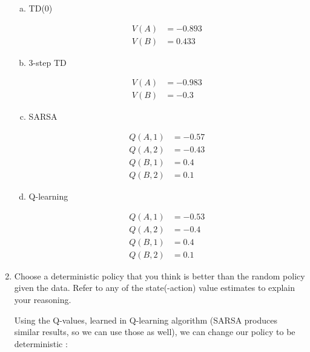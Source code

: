 \documentclass{exam}
\begin{document}
\begin{problem}
\begin{enumerate}
    \begin{enumerate}[(a)]
        \item TD(0)
        \begin{solutionorlines}[2in]
            \begin{align*}
                V(A) &= -0.893\\
                V(B) &= 0.433
            \end{align*}
        \end{solutionorlines}
        \item 3-step TD
        \begin{solutionorlines}[2in]
            \begin{align*}
                V(A) &= -0.983\\
                V(B) &= -0.3
            \end{align*}
        \end{solutionorlines}
        \item SARSA
        \begin{solutionorlines}[2in]
            \begin{align*}
                Q(A, 1) &= -0.57\\
                Q(A, 2) &= -0.43\\
                Q(B, 1) &= 0.4\\
                Q(B, 2) &= 0.1
            \end{align*}
        \end{solutionorlines}
        \item Q-learning
        \begin{solutionorlines}[2in]
            \begin{align*}
                Q(A, 1) &= -0.53\\
                Q(A, 2) &= -0.4\\
                Q(B, 1) &= 0.4\\
                Q(B, 2) &= 0.1
            \end{align*}
        \end{solutionorlines}
    \end{enumerate}
    \item Choose a deterministic policy that you think is better than the random policy given the data. Refer to any of the state(-action) value estimates to explain your reasoning.
    \begin{solutionorlines}[2in]
    Using the Q-values, learned in Q-learning algorithm (SARSA produces similar results, so we can use those as well), we can change our policy to be deterministic :

\end{solutionorlines}
\end{enumerate}
\end{problem}
\end{document}
